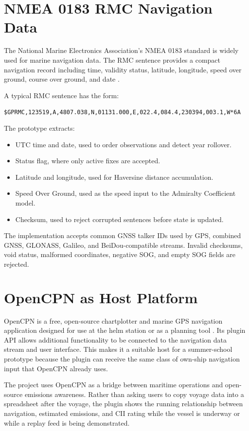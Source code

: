 \section{NMEA 0183 RMC Navigation Data}
The National Marine Electronics Association's NMEA 0183 standard is widely used for marine navigation data. The RMC sentence provides a compact navigation record including time, validity status, latitude, longitude, speed over ground, course over ground, and date \cite{nmea0183}.

A typical RMC sentence has the form:
\begin{center}
\texttt{\$GPRMC,123519,A,4807.038,N,01131.000,E,022.4,084.4,230394,003.1,W*6A}
\end{center}

The prototype extracts:
\begin{itemize}
    \item UTC time and date, used to order observations and detect year rollover.
    \item Status flag, where only active fixes are accepted.
    \item Latitude and longitude, used for Haversine distance accumulation.
    \item Speed Over Ground, used as the speed input to the Admiralty Coefficient model.
    \item Checksum, used to reject corrupted sentences before state is updated.
\end{itemize}

The implementation accepts common GNSS talker IDs used by GPS, combined GNSS, GLONASS, Galileo, and BeiDou-compatible streams. Invalid checksums, void status, malformed coordinates, negative SOG, and empty SOG fields are rejected.

\section{OpenCPN as Host Platform}
OpenCPN is a free, open-source chartplotter and marine GPS navigation application designed for use at the helm station or as a planning tool \cite{opencpnOfficial2026}. Its plugin API allows additional functionality to be connected to the navigation data stream and user interface. This makes it a suitable host for a summer-school prototype because the plugin can receive the same class of own-ship navigation input that OpenCPN already uses.

The project uses OpenCPN as a bridge between maritime operations and open-source emissions awareness. Rather than asking users to copy voyage data into a spreadsheet after the voyage, the plugin shows the running relationship between navigation, estimated emissions, and CII rating while the vessel is underway or while a replay feed is being demonstrated.
